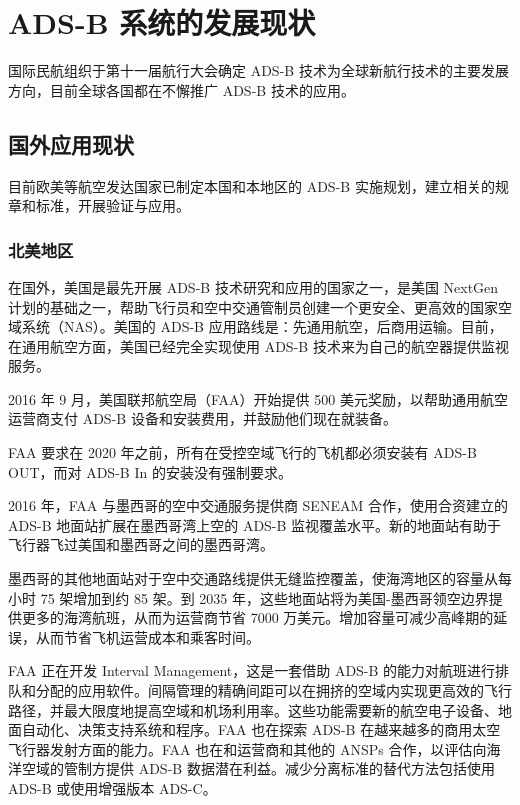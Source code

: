 \section{ADS-B 系统的发展现状}

国际民航组织于第十一届航行大会确定 ADS-B 技术为全球新航行技术的主要发展方向，目前全球各国都在不懈推广 ADS-B 技术的应用。

\subsection{国外应用现状}

目前欧美等航空发达国家已制定本国和本地区的 ADS-B 实施规划，建立相关的规章和标准，开展验证与应用。

\subsubsection{北美地区}

在国外，美国是最先开展 ADS-B 技术研究和应用的国家之一，是美国 NextGen 计划的基础之一，帮助飞行员和空中交通管制员创建一个更安全、更高效的国家空域系统（NAS）。美国的 ADS-B 应用路线是：先通用航空，后商用运输。目前，在通用航空方面，美国已经完全实现使用 ADS-B 技术来为自己的航空器提供监视服务。

2016 年 9 月，美国联邦航空局（FAA）开始提供 500 美元奖励，以帮助通用航空运营商支付 ADS-B 设备和安装费用，并鼓励他们现在就装备。

FAA 要求在 2020 年之前，所有在受控空域飞行的飞机都必须安装有 ADS-B OUT，而对 ADS-B In 的安装没有强制要求。

2016 年，FAA 与墨西哥的空中交通服务提供商 SENEAM 合作，使用合资建立的 ADS-B 地面站扩展在墨西哥湾上空的 ADS-B 监视覆盖水平。新的地面站有助于飞行器飞过美国和墨西哥之间的墨西哥湾。

墨西哥的其他地面站对于空中交通路线提供无缝监控覆盖，使海湾地区的容量从每小时 75 架增加到约 85 架。到 2035 年，这些地面站将为美国-墨西哥领空边界提供更多的海湾航班，从而为运营商节省 7000 万美元。增加容量可减少高峰期的延误，从而节省飞机运营成本和乘客时间。

FAA 正在开发 Interval Management，这是一套借助 ADS-B 的能力对航班进行排队和分配的应用软件。间隔管理的精确间距可以在拥挤的空域内实现更高效的飞行路径，并最大限度地提高空域和机场利用率。这些功能需要新的航空电子设备、地面自动化、决策支持系统和程序。FAA 也在探索 ADS-B 在越来越多的商用太空飞行器发射方面的能力。FAA 也在和运营商和其他的 ANSPs 合作，以评估向海洋空域的管制方提供 ADS-B 数据潜在利益。减少分离标准的替代方法包括使用 ADS-B 或使用增强版本 ADS-C。

